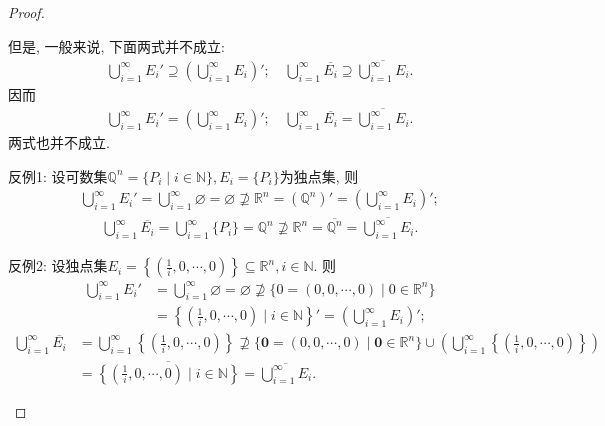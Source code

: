 \documentclass[../../main.tex]{subfiles}%
\begin{document}
\begin{proof}
\begin{enumerate}[(1)]
但是, 一般来说, 下面两式并不成立:
\begin{align*}
\bigcup_{i=1}^\infty E_i' \supseteq \left( \bigcup_{i=1}^\infty E_i \right)'; \quad \bigcup_{i=1}^\infty \overline{E_i} \supseteq \overline{\bigcup_{i=1}^\infty E_i}.
\end{align*}
因而
\begin{align*}
\bigcup_{i=1}^\infty E_i' = \left( \bigcup_{i=1}^\infty E_i \right)'; \quad \bigcup_{i=1}^\infty \overline{E_i} = \overline{\bigcup_{i=1}^\infty E_i}.
\end{align*}
两式也并不成立.

反例1: 设可数集$\mathbb{Q}^n = \{P_i \mid i \in \mathbb{N}\}, E_i = \{P_i\}$为独点集, 则
\begin{align*}
\bigcup_{i=1}^\infty E_i' = \bigcup_{i=1}^\infty \varnothing = \varnothing \not\supseteq \mathbb{R}^n = (\mathbb{Q}^n)' = \left( \bigcup_{i=1}^\infty E_i \right)';
\end{align*}
\begin{align*}
\bigcup_{i=1}^\infty \overline{E_i} = \bigcup_{i=1}^\infty \{P_i\} = \mathbb{Q}^n \not\supseteq \mathbb{R}^n = \overline{\mathbb{Q}^n} = \overline{\bigcup_{i=1}^\infty E_i}.
\end{align*}

反例2: 设独点集$E_i = \left\{ \left( \frac{1}{i},0,\cdots,0 \right) \right\} \subseteq \mathbb{R}^n, i \in \mathbb{N}$. 则
\begin{align*}
\bigcup_{i=1}^{\infty}{E_i'} &=\bigcup_{i=1}^{\infty}{\varnothing}=\varnothing \nsupseteq \{0=(0,0,\cdots ,0)\mid 0\in \mathbb{R} ^n\}
\\
&=\left\{ \left( \frac{1}{i},0,\cdots ,0 \right) \mid i\in \mathbb{N} \right\}' =\left( \bigcup_{i=1}^{\infty}{E_i} \right)' ;
\end{align*}
\begin{align*}
\bigcup_{i=1}^\infty \overline{E_i} &= \bigcup_{i=1}^\infty \left\{ \left( \frac{1}{i},0,\cdots,0 \right) \right\} \not\supseteq \{ \mathbf{0} = (0,0,\cdots,0) \mid \mathbf{0} \in \mathbb{R}^n \} \cup \left( \bigcup_{i=1}^\infty \left\{ \left( \frac{1}{i},0,\cdots,0 \right) \right\} \right) \\
&= \overline{\left\{ \left( \frac{1}{i},0,\cdots,0 \right) \mid i \in \mathbb{N} \right\}} = \overline{\bigcup_{i=1}^\infty E_i}.
\end{align*}
\end{enumerate}

\end{proof}
\end{document}
